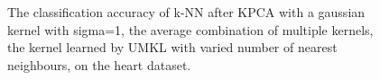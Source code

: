 \begin{figure}[!ht]\label{figure:acml-k-nn}
\hspace{-0.1in}
\begin{center}
\caption{The classification accuracy of k-NN after KPCA with a gaussian kernel with sigma=1, the average combination of multiple kernels, the kernel learned by UMKL with varied number of nearest neighbours, on the heart dataset.}
\end{center}
\end{figure}

